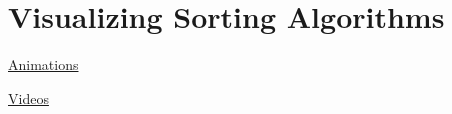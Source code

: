 \documentclass[8pt,a4paper,compress]{beamer}
\begin{document}
\section{Visualizing Sorting Algorithms}
\begin{frame}[fragile]
\pause

\href{http://www.sorting-algorithms.com/}{Animations \ExternalLink}

\begin{center}
\end{center}
\end{frame}

\begin{frame}[fragile]
\pause

\href{https://www.youtube.com/user/AlgoRythmics/videos}{Videos \ExternalLink}

\begin{center}
\end{center}
\end{frame}
\end{document}

